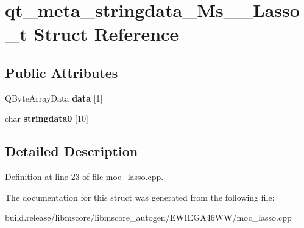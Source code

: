 \hypertarget{structqt__meta__stringdata___ms_____lasso__t}{}\section{qt\+\_\+meta\+\_\+stringdata\+\_\+\+Ms\+\_\+\+\_\+\+Lasso\+\_\+t Struct Reference}
\label{structqt__meta__stringdata___ms_____lasso__t}
\subsection*{Public Attributes}
\begin{DoxyCompactItemize}
\item 
\mbox{\label{structqt__meta__stringdata___ms_____lasso__t_a1cea47faa4aa562c34da94770a02b193}} 
Q\+Byte\+Array\+Data {\bfseries data} \mbox{[}1\mbox{]}
\item 
\mbox{\label{structqt__meta__stringdata___ms_____lasso__t_a24e2c66dcb28b9230fa0cfc1cde22ff7}} 
char {\bfseries stringdata0} \mbox{[}10\mbox{]}
\end{DoxyCompactItemize}


\subsection{Detailed Description}


Definition at line 23 of file moc\+\_\+lasso.\+cpp.



The documentation for this struct was generated from the following file\+:\begin{DoxyCompactItemize}
\item 
build.\+release/libmscore/libmscore\+\_\+autogen/\+E\+W\+I\+E\+G\+A46\+W\+W/moc\+\_\+lasso.\+cpp\end{DoxyCompactItemize}
